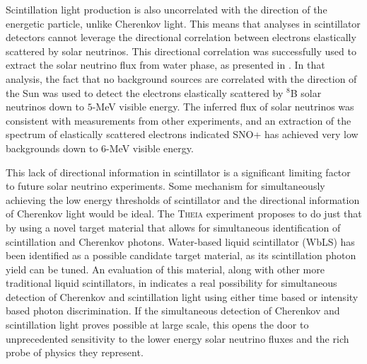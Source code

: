 Scintillation light production is also uncorrelated with the direction of the energetic particle, unlike Cherenkov light.
This means that analyses in scintillator detectors cannot leverage the directional correlation between electrons elastically scattered by solar neutrinos.
This directional correlation was successfully used to extract the solar neutrino flux from {\snop} water phase, as presented in .
In that analysis, the fact that no background sources are correlated with the direction of the Sun was used to detect the electrons elastically scattered by $^8$B solar neutrinos down to $5$-MeV visible energy.
The inferred flux of solar neutrinos was consistent with measurements from other experiments, and an extraction of the spectrum of elastically scattered electrons indicated SNO+ has achieved very low backgrounds down to $6$-MeV visible energy.

This lack of directional information in scintillator is a significant limiting factor to future solar neutrino experiments.
Some mechanism for simultaneously achieving the low energy thresholds of scintillator and the directional information of Cherenkov light would be ideal.
The \textsc{Theia} experiment proposes to do just that by using a novel target material that allows for simultaneous identification of scintillation and Cherenkov photons.
Water-based liquid scintillator (WbLS) has been identified as a possible candidate target material, as its scintillation photon yield can be tuned.
An evaluation of this material, along with other more traditional liquid scintillators, in  indicates a real possibility for simultaneous detection of Cherenkov and scintillation light using either time based or intensity based photon discrimination.
If the simultaneous detection of Cherenkov and scintillation light proves possible at large scale, this opens the door to unprecedented sensitivity to the lower energy solar neutrino fluxes and the rich probe of physics they represent.
